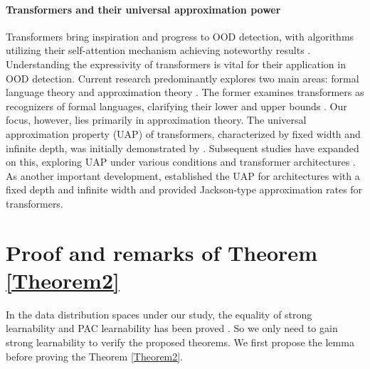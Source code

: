 \documentclass{article}
\theoremstyle{plain}
\theoremstyle{definition}
\theoremstyle{remark}
\begin{document}
\paragraph{Transformers and their universal approximation power}
\label{related transformer}

Transformers bring inspiration and progress to OOD detection, with algorithms utilizing their self-attention mechanism achieving noteworthy results \citep{koner2021oodformer, hendrycks2020pretrained, podolskiy2021revisiting, zhou2021contrastive}.
Understanding the expressivity of transformers is vital for their application in OOD detection. 
Current research predominantly explores two main areas: formal language theory and approximation theory \citep{strobl2023transformers}.
The former examines transformers as recognizers of formal languages, clarifying their lower and upper bounds \citep{hahn2020theoretical, chiang2023tighter, merrill2024logic}.
Our focus, however, lies primarily in approximation theory. The universal approximation property (UAP) of transformers, characterized by fixed width and infinite depth, was initially demonstrated by \citet{yun2019transformers}.
Subsequent studies have expanded on this, exploring UAP under various conditions and transformer architectures \citep{yun2020n, kratsios2021universal, luo2022your, alberti2023sumformer}. 
As another important development, \citet{jiang2023approximation} established the UAP for architectures with a fixed depth and infinite width and provided Jackson-type approximation rates for transformers. 

\section{Proof and remarks of Theorem \ref{Theorem2}}
\label{appendix A}

In the data distribution spaces under our study, the equality of strong learnability and PAC learnability has been proved \citep{fang2022out}. So we only need to gain strong learnability to verify the proposed theorems. We first propose the lemma before proving the Theorem \ref{Theorem2}.
\end{document}
